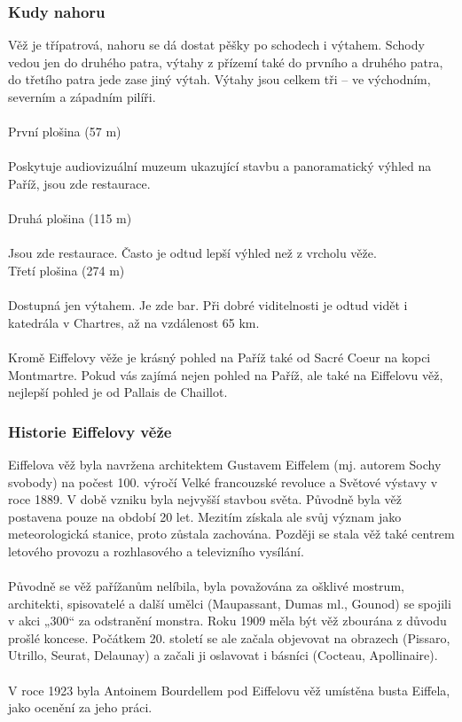 \subsubsection{Kudy nahoru}
Věž je třípatrová, nahoru se dá dostat pěšky po schodech i výtahem. Schody vedou jen do druhého patra, výtahy z přízemí také do prvního a druhého patra, do třetího patra jede zase jiný výtah. Výtahy jsou celkem tři – ve východním, severním a západním pilíři.\\\\První plošina (57 m)\\
\\
Poskytuje audiovizuální muzeum ukazující stavbu a panoramatický výhled na Paříž, jsou zde restaurace.\\
\\
Druhá plošina (115 m)\\
\\
Jsou zde restaurace. Často je odtud lepší výhled než z vrcholu věže.\\
Třetí plošina (274 m)\\
\\
Dostupná jen výtahem. Je zde bar. Při dobré viditelnosti je odtud vidět i katedrála v Chartres, až na vzdálenost 65 km.\\
\\
Kromě Eiffelovy věže je krásný pohled na Paříž také od Sacré Coeur na kopci Montmartre. Pokud vás zajímá nejen pohled na Paříž, ale také na Eiffelovu věž, nejlepší pohled je od Pallais de Chaillot.
\\

\subsubsection{Historie Eiffelovy věže}
Eiffelova věž byla navržena architektem Gustavem Eiffelem (mj. autorem Sochy svobody) na počest 100. výročí Velké francouzské revoluce a Světové výstavy v roce 1889. V době vzniku byla nejvyšší stavbou světa. Původně byla věž postavena pouze na období 20 let. Mezitím získala ale svůj význam jako meteorologická stanice, proto zůstala zachována. Později se stala věž také centrem letového provozu a rozhlasového a televizního vysílání.\\
\\
Původně se věž pařížanům nelíbila, byla považována za ošklivé mostrum, architekti, spisovatelé a další umělci (Maupassant, Dumas ml., Gounod) se spojili v akci „300“ za odstranění monstra. Roku 1909 měla být věž zbourána z důvodu prošlé koncese. Počátkem 20. století se ale začala objevovat na obrazech (Pissaro, Utrillo, Seurat, Delaunay) a začali ji oslavovat i básníci (Cocteau, Apollinaire).\\\\V roce 1923 byla Antoinem Bourdellem pod Eiffelovu věž umístěna busta Eiffela, jako ocenění za jeho práci.\\

